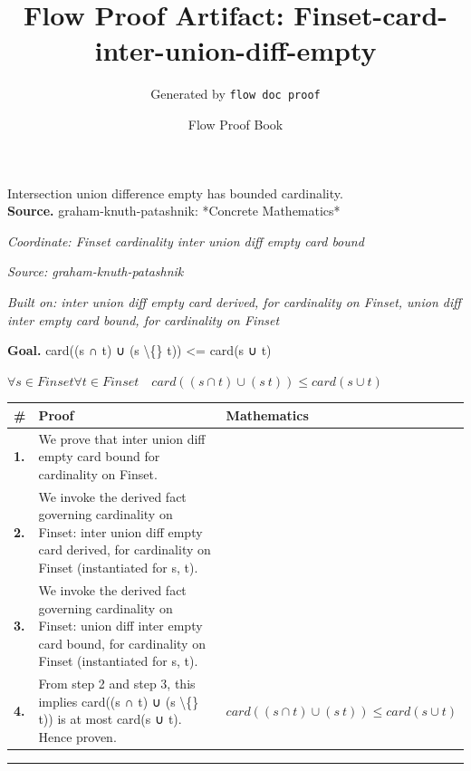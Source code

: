 \documentclass[11pt]{article}
\title{Flow Proof Artifact: Finset-card-inter-union-diff-empty}
\author{Generated by \texttt{flow doc proof}}
\date{Flow Proof Book}
\theoremstyle{definition}
\begin{document}
\maketitle
Intersection union difference empty has bounded cardinality.\\[0.5em]
\textbf{Source.} graham-knuth-patashnik: *Concrete Mathematics*\\[0.5em]
\bigskip
{}\par
\smallskip\noindent\textit{Coordinate: Finset \cdot cardinality \cdot inter union diff empty card bound}\par
\smallskip\noindent\textit{Source: graham-knuth-patashnik}\par
\smallskip\noindent\textit{Built on: inter union diff empty card derived, for cardinality on Finset, union diff inter empty card bound, for cardinality on Finset}\par
\medskip
\noindent\textbf{Goal.} card((s ∩ t) ∪ (s \textbackslash\{\} t)) <= card(s ∪ t)\par
\noindent$\displaystyle \forall s \in Finset \forall t \in Finset\quad card((s ∩ t) ∪ (s \ t)) \le card(s ∪ t)$\par
\medskip
\noindent
\begin{tabular}{@{} >{\raggedright\arraybackslash}p{} >{\raggedright\arraybackslash}p{} >{\raggedleft\arraybackslash}p{} @{}}
\textbf{\#} & \textbf{Proof} & \textbf{Mathematics} \\
\midrule
\textbf{1.} & We prove that inter union diff empty card bound for cardinality on Finset. & \\[0.45em]
\textbf{2.} & We invoke the derived fact governing cardinality on Finset: inter union diff empty card derived, for cardinality on Finset (instantiated for s, t). & \\[0.45em]
\textbf{3.} & We invoke the derived fact governing cardinality on Finset: union diff inter empty card bound, for cardinality on Finset (instantiated for s, t). & \\[0.45em]
\textbf{4.} & From step 2 and step 3, this implies card((s ∩ t) ∪ (s \textbackslash\{\} t)) is at most card(s ∪ t). Hence proven. & $\displaystyle card((s ∩ t) ∪ (s \ t)) \le card(s ∪ t)$ \\[0.45em]
\bottomrule
\end{tabular}
\label{thm:Finset-cardinality-inter_union_diff_empty_card_bound}
\par\medskip\hrule
\end{document}

